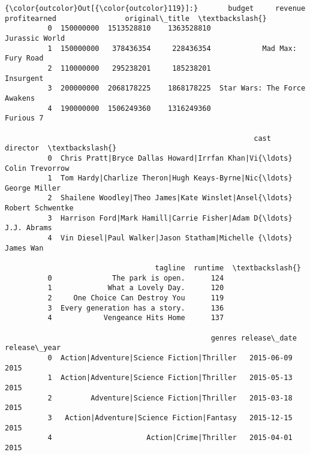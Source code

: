 \documentclass[11pt]{article}
\begin{document}
\begin{Verbatim}[commandchars=\\\{\}]
{\color{outcolor}Out[{\color{outcolor}119}]:}       budget     revenue  profitearned                original\_title  \textbackslash{}
          0  150000000  1513528810    1363528810                Jurassic World   
          1  150000000   378436354     228436354            Mad Max: Fury Road   
          2  110000000   295238201     185238201                     Insurgent   
          3  200000000  2068178225    1868178225  Star Wars: The Force Awakens   
          4  190000000  1506249360    1316249360                     Furious 7   
          
                                                          cast          director  \textbackslash{}
          0  Chris Pratt|Bryce Dallas Howard|Irrfan Khan|Vi{\ldots}   Colin Trevorrow   
          1  Tom Hardy|Charlize Theron|Hugh Keays-Byrne|Nic{\ldots}     George Miller   
          2  Shailene Woodley|Theo James|Kate Winslet|Ansel{\ldots}  Robert Schwentke   
          3  Harrison Ford|Mark Hamill|Carrie Fisher|Adam D{\ldots}       J.J. Abrams   
          4  Vin Diesel|Paul Walker|Jason Statham|Michelle {\ldots}         James Wan   
          
                                   tagline  runtime  \textbackslash{}
          0              The park is open.      124   
          1             What a Lovely Day.      120   
          2     One Choice Can Destroy You      119   
          3  Every generation has a story.      136   
          4            Vengeance Hits Home      137   
          
                                                genres release\_date  release\_year  
          0  Action|Adventure|Science Fiction|Thriller   2015-06-09          2015  
          1  Action|Adventure|Science Fiction|Thriller   2015-05-13          2015  
          2         Adventure|Science Fiction|Thriller   2015-03-18          2015  
          3   Action|Adventure|Science Fiction|Fantasy   2015-12-15          2015  
          4                      Action|Crime|Thriller   2015-04-01          2015  
\end{Verbatim}
            
\end{document}
